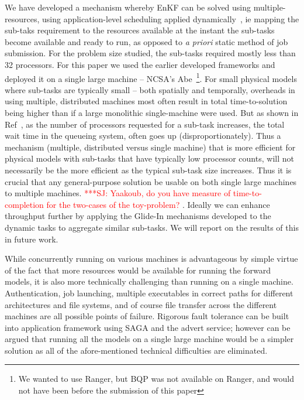 \documentclass[conference,final]{IEEEtran}
\newcommand{\jhanote}[1]{ {\textcolor{red} { ***SJ: #1 }}}
\newcommand{\jhanote}[1]{}
\begin{document}
We have developed a mechanism whereby EnKF can be
solved using multiple-resources, using application-level scheduling
applied dynamically~\cite{saga_tg08}, ie mapping the sub-taks
requirement to the resources available at the instant the sub-tasks
become available and ready to run, as opposed to {\it a priori} static
method of job submission. For the problem size studied, the sub-tasks
required mostly less than 32 processors. For this paper we used the
earlier developed frameworks and deployed it on a single large machine
-- NCSA's Abe~\footnote{We wanted to use Ranger, but BQP was not
  available on Ranger, and would not have been before the submission
  of this paper}. For small physical models where sub-tasks are
typically small -- both spatially and temporally, overheads in using
multiple, distributed machines most often result in total
time-to-solution being higher than if a large monolithic
single-machine were used. But as shown in
Ref~\cite{novelsubmissionmode}, as the number of processors requested
for a sub-task increases, the total wait time in the queueing system,
often goes up (disproportionately). Thus a mechanism (multiple,
distributed versus single machine) that is more efficient for physical
models with sub-tasks that have typically low processor counts, will
not necessarily be the more efficient as the typical sub-task size
increases. Thus it is crucial that any general-purpose solution be
usable on both single large machines to multiple machines.
\jhanote{Yaakoub, do you have measure of time-to-completion for the
  two-cases of the toy-problem?}. Ideally we can enhance throughput
further by applying the Glide-In mechanisms developed to the dynamic
tasks to aggregate similar sub-tasks. We will report on the results of
this in future work.


While concurrently running on various machines is advantageous by
simple virtue of the fact that more resources would be available for
running the forward models, it is also more technically challenging
than running on a single machine.  Authentication, job launching,
multiple executables in correct paths for different architectures and
file systems, and of course file transfer across the different
machines are all possible points of failure. Rigorous fault tolerance
can be built into application framework using SAGA and the advert
service; however can be argued that running all the models on a single
large machine would be a simpler solution as all of the
afore-mentioned technical difficulties are eliminated.
\end{document}
